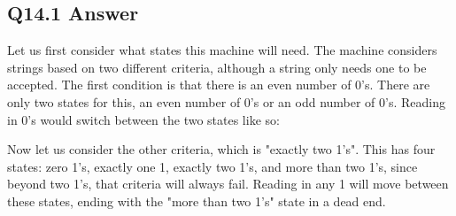 \documentclass{article}
\begin{document}
\subsection*{Q14.1 Answer}
Let us first consider what states this machine will need. The machine considers strings based on two different criteria, although a string only needs one to be accepted. The first condition is that there is an even number of 0's. There are only two states for this, an even number of 0's or an odd number of 0's. Reading in 0's would switch between the two states like so:
\begin{center}
\end{center}
Now let us consider the other criteria, which is "exactly two 1's". This has four states: zero 1's, exactly one 1, exactly two 1's, and more than two 1's, since beyond two 1's, that criteria will always fail. Reading in any 1 will move between these states, ending with the "more than two 1's" state in a dead end.
\end{document}
